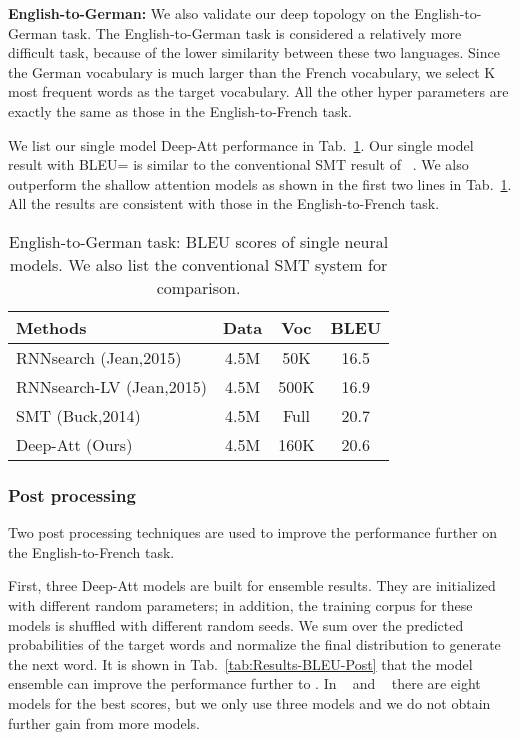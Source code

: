\documentclass[11pt,letterpaper]{article}
\begin{document}
\textbf{English-to-German:} We also validate our deep topology on the English-to-German task. The English-to-German task is considered a
relatively more \mbox{difficult} task, because of the lower similarity between these two languages. Since the German vocabulary is much larger
than the French vocabulary, we select K most frequent words as the target vocabulary. All the other hyper parameters are exactly the same
as those in the English-to-French task.

We list our single model Deep-Att performance in Tab.~\ref{tab:Results-BLEU-SingleGerman}. Our single model result with BLEU= is similar
to the conventional SMT result of ~\cite{Buck-Ooyen-2014}. We also outperform the shallow attention models as shown in the first two
lines in Tab.~\ref{tab:Results-BLEU-SingleGerman}. All the results are consistent with those in the English-to-French task.
\begin{table}[!ht]
\footnotesize
\begin{center}
\begin{tabular}{|l|c|c|c|}
\hline
  Methods &  Data  & Voc & BLEU \\
  \hline
  \hline
  RNNsearch (Jean,2015)  & 4.5M & 50K & 16.5 \\
  RNNsearch-LV (Jean,2015)  & 4.5M & 500K & 16.9 \\
  \hline
  SMT (Buck,2014) & 4.5M & Full & 20.7 \\
  \hline
  Deep-Att (Ours)  & 4.5M & 160K & 20.6  \\
  \hline
\end{tabular}
\end{center}
\caption{\label{tab:Results-BLEU-SingleGerman} English-to-German task: BLEU scores of single neural models. We also list the conventional SMT
system for comparison. }
\end{table}


\subsubsection{Post processing}

Two post processing techniques are used to improve the performance further on the English-to-French task.

First,  three Deep-Att models are built for ensemble results. They are initialized with different random parameters;  in addition, the
training corpus for these models is shuffled with different random seeds. We sum over the predicted probabilities  of the target words and
normalize the final distribution to  generate the next word. It is shown in Tab.~\ref{tab:Results-BLEU-Post} that the model ensemble can
improve the performance further to . In ~ and ~ there are eight models for
the best scores, but we only use three models and we do not obtain further gain from more models.
\end{document}
